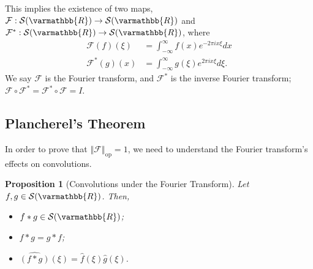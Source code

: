 \documentclass[12pt]{extarticle}
\newcommand{\R}{\varmathbb{R}}
\newcommand{\norm}[1]{\left\Vert #1\right\Vert}
\theoremstyle{plain}
\newtheorem*{proposition}{Proposition}%
\theoremstyle{definition}
\theoremstyle{remark}
\begin{document}
  This implies the existence of two maps, $\mathcal{F}: \mathcal{S}(\R)\rightarrow \mathcal{S}(\R)$ and $\mathcal{F}^{\ast}:\mathcal{S}(\R)\rightarrow \mathcal{S}(\R)$, where
  \begin{align*}
    \mathcal{F}(f)(\xi) &= \int_{-\infty}^{\infty}f(x)e^{-2\pi i x \xi}dx\\
    \mathcal{F}^{\ast}(g)(x) &= \int_{-\infty}^{\infty} g(\xi)e^{2\pi i x \xi}d\xi.
  \end{align*}
  We say $\mathcal{F}$ is the Fourier transform, and $\mathcal{F}^{\ast}$ is the inverse Fourier transform; $\mathcal{F}\circ \mathcal{F}^{\ast} = \mathcal{F}^{\ast}\circ \mathcal{F} = I$.
  \subsection{Plancherel's Theorem}%
  In order to prove that $\norm{\mathcal{F}}_{\text{op}} = 1$, we need to understand the Fourier transform's effects on convolutions.
  \begin{proposition}[Convolutions under the Fourier Transform]
    Let $f,g\in \mathcal{S}(\R)$. Then,
    \begin{itemize}
      \item $f\ast g \in \mathcal{S}(\R)$;
      \item $f\ast g = g\ast f$;
      \item $\widehat{\left(f\ast g\right)}(\xi) = \hat{f}(\xi)\hat{g}(\xi)$.
    \end{itemize}
  \end{proposition}
\end{document}
